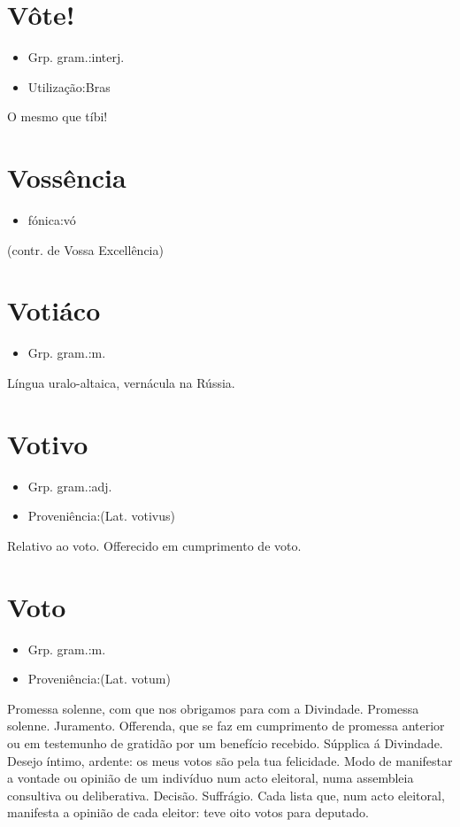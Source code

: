 \documentclass{article}
\begin{document}
\section{Vôte!}
\begin{itemize}
\item {Grp. gram.:interj.}
\end{itemize}
\begin{itemize}
\item {Utilização:Bras}
\end{itemize}
O mesmo que \textunderscore tíbi!\textunderscore 
\section{Vossência}
\begin{itemize}
\item {fónica:vó}
\end{itemize}
(contr. de \textunderscore Vossa Excellência\textunderscore )
\section{Votiáco}
\begin{itemize}
\item {Grp. gram.:m.}
\end{itemize}
Língua uralo-altaica, vernácula na Rússia.
\section{Votivo}
\begin{itemize}
\item {Grp. gram.:adj.}
\end{itemize}
\begin{itemize}
\item {Proveniência:(Lat. \textunderscore votivus\textunderscore )}
\end{itemize}
Relativo ao voto.
Offerecido em cumprimento de voto.
\section{Voto}
\begin{itemize}
\item {Grp. gram.:m.}
\end{itemize}
\begin{itemize}
\item {Proveniência:(Lat. \textunderscore votum\textunderscore )}
\end{itemize}
Promessa solenne, com que nos obrigamos para com a Divindade.
Promessa solenne.
Juramento.
Offerenda, que se faz em cumprimento de promessa anterior ou em testemunho de gratidão por um benefício recebido.
Súpplica á Divindade.
Desejo íntimo, ardente: \textunderscore os meus votos são pela tua felicidade\textunderscore .
Modo de manifestar a vontade ou opinião de um indivíduo num acto eleitoral, numa assembleia consultiva ou deliberativa.
Decisão.
Suffrágio.
Cada lista que, num acto eleitoral, manifesta a opinião de cada eleitor: \textunderscore teve oito votos para deputado\textunderscore .
\end{document}
